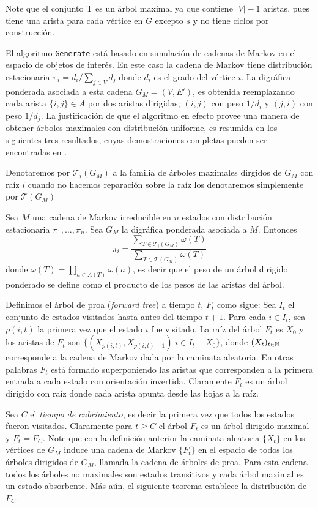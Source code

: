 Note que el conjunto T es un árbol maximal ya que contiene $|V| - 1$ aristas, pues tiene una arista para cada vértice en $G$ excepto $s$ y no tiene ciclos por construcción.

El algoritmo \texttt{Generate} está basado en simulación de cadenas de Markov en el espacio de objetos de interés. En este caso la cadena de Markov tiene distribución estacionaria $\pi_{i}=d_{i}/\sum_{j\in V} d_{j}$ donde $d_{i}$ es el grado del vértice $i$. La digráfica ponderada asociada a esta cadena $G_M =(V,E')$, es obtenida reemplazando cada arista $\{i,j\}\in A$ por dos aristas dirigidas; $(i,j)$ con peso $1/d_{i}$ y $(j,i)$ con peso $1/d_{j}$. La justificación de que el algoritmo en efecto provee una manera de obtener árboles maximales con distribución uniforme, es resumida en los siguientes tres resultados, cuyas demostraciones completas pueden ser encontradas en \cite{Broder89}.

Denotaremos por $\mathcal{T}_{i}(G_{M})$ a la familia de árboles maximales dirgidos de $G_{M}$ con raíz $i$ cuando no hacemos reparación sobre la raíz los denotaremos simplemente por $\mathcal{T}(G_{M})$ 

\begin{theorem}
Sea $M$ una cadena de Markov irreducible en $n$ estados con distribución estacionaria $\pi_1, \dots, \pi_n$. Sea $G_{M}$ la digráfica ponderada asociada a $M$. Entonces
$$\pi_{i} = \frac{\sum_{ T \in \mathcal{T}_{i}(G_{M})} \omega (T)}{\sum _{T \in \mathcal{T}(G_{M})} \omega (T)}$$
donde $\omega(T) = \prod_{a\in A(T)}\omega(a)$, es decir que el peso de un árbol dirigido ponderado se define como el producto de los pesos de las aristas del árbol. 
\end{theorem}

Definimos el árbol de proa (\textit{forward tree}) a tiempo $t$, $F_{t}$ como sigue: Sea $I_{t}$ el conjunto de estados visitados hasta antes del tiempo $t+1$. Para cada $i\in I_{t}$, sea $p(i,t)$ la primera vez que el estado $i$ fue visitado. La raíz del árbol $F_{t}$ es $X_{0}$ y los aristas de $F_{t}$ son $\{(X_{p(i,t)},X_{p(i,t)-1}) | i\in I_{t}-X_{0}\}$, donde $(X_{t})_{t\in \mathbb{N}}$ corresponde a la cadena de Markov dada por la caminata aleatoria. En otras palabras $F_{t}$ está formado superponiendo las aristas que corresponden a la primera entrada a cada estado con orientación invertida. Claramente $F_{t}$ es un árbol dirigido con raíz donde cada arista apunta desde las hojas a la raíz.

Sea $C$ el \textit{tiempo de cubrimiento}, es decir la primera vez que todos los estados fueron visitados. Claramente para $t\geq C$ el árbol $F_{t}$ es un árbol dirigido maximal y $F_{t}=F_{C}$. Note que con la definición anterior la caminata aleatoria $\{X_{t}\}$ en los vértices de $G_{M}$ induce una cadena de Markov $\{F_{t}\}$ en el espacio de todos los árboles dirigidos de $G_{M}$, llamada la cadena de árboles de proa. Para esta cadena todos los árboles no maximales son estados transitivos y cada árbol maximal es un estado absorbente. Más aún, el siguiente teorema establece la distribución de $F_{C}$.

